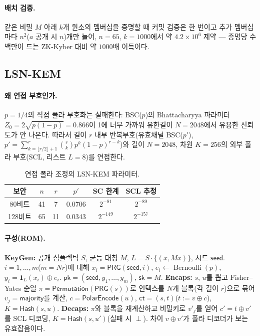 \documentclass[11pt,a4paper]{article}
\theoremstyle{plain}
\theoremstyle{definition}
\begin{document}
\paragraph{배치 검증.} 같은 비밀 $M$ 아래 $k$개 원소의 멤버십을 증명할 때 커밋 검증은 한 번이고 추가 멤버십마다 $n^2$($a$ 공개 시 $n$)개만 늘어, $n=65$, $k=1000$에서 약 $4.2\times 10^6$ 제약 --- 증명당 수백만이 드는 ZK-Kyber 대비 약 $1000$배 이득이다.

\subsection{LSN-KEM}

\paragraph{왜 연접 부호인가.} $p=1/4$의 직접 폴라 부호화는 실패한다: BSC($p$)의 Bhattacharyya 파라미터 $Z_0 = 2\sqrt{p(1-p)} = 0.866$이 1에 너무 가까워 유한길이 $N=2048$에서 유용한 신뢰도가 안 나온다. 따라서 길이 $r$ 내부 반복부호(유효채널 BSC($p'$), $p' = \sum_{k=\lfloor r/2\rfloor+1}^{r}\binom{r}{k}p^k(1-p)^{r-k}$)와 길이 $N=2048$, 차원 $K=256$의 외부 폴라 부호(SCL, 리스트 $L=8$)를 연접한다.

\begin{table}[ht]
\centering
\caption{연접 폴라 조정의 LSN-KEM 파라미터.}
\begin{tabular}{@{}cccccc@{}}
\hline
보안 & $n$ & $r$ & $p'$ & SC 한계 & SCL 추정 \\
\hline
80비트  & 41 & 7  & 0.0706 & $2^{-81}$  & $2^{-89}$ \\
128비트 & 65 & 11 & 0.0343 & $2^{-149}$ & $2^{-157}$ \\
\hline
\end{tabular}
\end{table}

\paragraph{구성(ROM).}
\textbf{KeyGen:} 공개 심플렉틱 $S$, 균등 대칭 $M$, $L = S\cdot\{(x,Mx)\}$, 시드 $\mathsf{seed}$. $i=1,\dots,m$($m = Nr$)에 대해 $x_i = \mathsf{PRG}(\mathsf{seed},i)$, $e_i \leftarrow \operatorname{Bernoulli}(p)$, $y_i = \mathbf{1}_L(x_i)\oplus e_i$. $\mathsf{pk} = (\mathsf{seed}, y_1,\dots,y_m)$, $\mathsf{sk} = M$.
\textbf{Encaps:} $s$, $u$를 뽑고 Fisher--Yates 순열 $\pi = \mathsf{Permutation}(\mathsf{PRG}(s))$로 인덱스를 $N$개 블록(각 길이 $r$)으로 묶어 $v_j = \mathsf{majority}$를 계산, $c = \mathsf{PolarEncode}(u)$, $\mathsf{ct} = (s, t)$($t := v\oplus c$), $K = \mathsf{Hash}(s,u)$.
\textbf{Decaps:} $\pi$와 블록을 재계산하고 비밀키로 $v'_j$를 얻어 $c' = t\oplus v'$를 SCL 디코딩, $K = \mathsf{Hash}(s,u')$(실패 시 $\perp$). 차이 $v\oplus v'$가 폴라 디코더가 보는 유효잡음이다.
\end{document}

